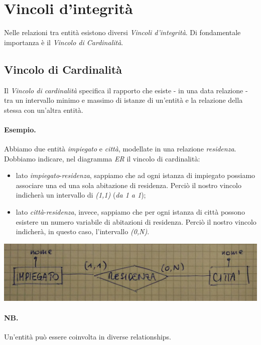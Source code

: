 \section{Vincoli d'integrità}
Nelle relazioni tra entità esistono diversi \textit{Vincoli d'integrità}. Di fondamentale importanza è il \textit{Vincolo di Cardinalità}.
\subsection{Vincolo di Cardinalità}
Il \textit{Vincolo di cardinalità} specifica il rapporto che esiste - in una data relazione - tra un intervallo minimo e massimo di istanze di un'entità e la relazione della stessa con un'altra entità.
\paragraph{Esempio.}
Abbiamo due entità \textit{impiegato} e \textit{città}, modellate in una relazione \textit{residenza}.
Dobbiamo indicare, nel diagramma \textit{ER} il vincolo di cardinalità:
\begin{itemize}
    \item lato \textit{impiegato}-\textit{residenza}, sappiamo che ad ogni istanza di impiegato possiamo associare una ed una sola abitazione di residenza. Perciò il nostro vincolo indicherà un intervallo di \textit{(1,1)} (\textit{da 1 a 1});
    \item lato \textit{città}-\textit{residenza}, invece, sappiamo che per ogni istanza di città possono esistere un numero variabile di abitazioni di residenza. Perciò il nostro vincolo indicherà, in questo caso, l'intervallo \textit{(0,N)}.
\end{itemize}
\begin{center}
    \includegraphics[width=.7\textwidth]{res/er-impiegato-citta.jpg} \hfill
\end{center}
\paragraph{NB.}
Un'entità può essere coinvolta in diverse relationships.
\newpage

